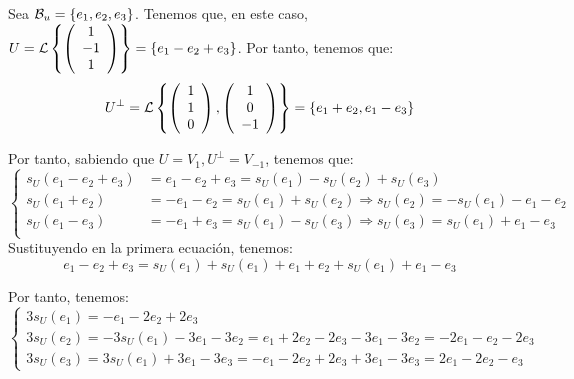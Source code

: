 \begin{ejercicio}
\begin{enumerate}
        Sea $\mathcal{B}_u=\{e_1, e_2, e_3\}$. Tenemos que, en este caso, $U=\mathcal{L}\left\{\left(\begin{array}{c}
            1 \\ -1 \\ 1
        \end{array}\right)\right\} = \{e_1-e_2+e_3\}$. Por tanto, tenemos que:
        \begin{equation*}
            U^\perp = \mathcal{L}\left\{
            \left(\begin{array}{c}
                1 \\ 1 \\ 0
            \end{array}\right),
            \left(\begin{array}{c}
                1 \\ 0 \\ -1
            \end{array}\right)
            \right\} = \{e_1+e_2, e_1-e_3\}
        \end{equation*}

        Por tanto, sabiendo que $U=V_1, U^\perp = V_{-1}$, tenemos que:
        \begin{equation*}
            \left\{\begin{array}{rl}
                s_U(e_1-e_2+e_3) &= e_1-e_2+e_3 = s_U(e_1) -s_U(e_2) + s_U(e_3) \\
                s_U(e_1+e_2) &= -e_1-e_2 = s_U(e_1) +s_U(e_2) \Longrightarrow s_U(e_2) = -s_U(e_1)-e_1-e_2\\
                s_U(e_1-e_3) &= -e_1+e_3 = s_U(e_1) -s_U(e_3) \Longrightarrow s_U(e_3)=s_U(e_1)+e_1-e_3\\
            \end{array}\right.
        \end{equation*}
        Sustituyendo en la primera ecuación, tenemos:
        \begin{equation*}
            e_1-e_2+e_3 = s_U(e_1) +s_U(e_1)+e_1+e_2 + s_U(e_1)+e_1-e_3
        \end{equation*}

        Por tanto, tenemos:
        \begin{equation*}
            \left\{\begin{array}{l}
                3s_U(e_1) = -e_1-2e_2+2e_3 \\
                3s_U(e_2) = -3s_U(e_1)-3e_1-3e_2 = e_1+2e_2-2e_3 -3e_1-3e_2 = -2e_1-e_2-2e_3\\
                3s_U(e_3) = 3s_U(e_1)+3e_1-3e_3 = -e_1-2e_2+2e_3+3e_1-3e_3 = 2e_1-2e_2-e_3
            \end{array}\right.
        \end{equation*}


\end{enumerate}
\end{ejercicio}
